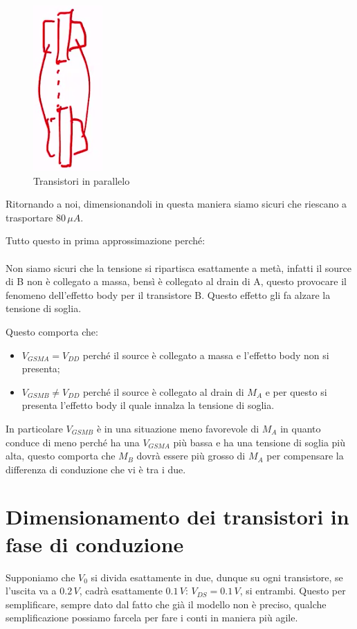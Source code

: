\begin{figure}[htbp]
    \centering
    \includegraphics[width=0.13\linewidth]{img/trans_parall.png}
    \caption{Transistori in parallelo}    
\end{figure}

\newpage
Ritornando a noi, dimensionandoli in questa maniera siamo sicuri che riescano a trasportare $80\,\mu A$. 

Tutto questo in prima approssimazione perché:
\paragraph{}
Non siamo sicuri che la tensione si ripartisca esattamente a metà, infatti il source di B non è collegato a massa, bensì è collegato al drain di A, questo provocare il fenomeno dell'effetto body per il transistore B. Questo effetto gli fa alzare la tensione di soglia.

Questo comporta che:
\begin{itemize}
    \item $V_{GSMA} = V_{DD}$ perché il source è collegato a massa e l'effetto body non si presenta;
    \item $V_{GSMB} \neq V_{DD}$ perché il source è collegato al drain di $M_A$ e per questo si presenta l'effetto body il quale innalza la tensione di soglia. 
\end{itemize}

In particolare $V_{GSMB}$ è in una situazione meno favorevole di $M_A$ in quanto conduce di meno perché ha una $V_{GSMA}$ più bassa e ha una tensione di soglia più alta, questo comporta che $M_B$ dovrà essere più grosso di $M_A$ per compensare la differenza di conduzione che vi è tra i due.

\newpage
\section{Dimensionamento dei transistori in fase di conduzione}

Supponiamo che $V_0$ si divida esattamente in due, dunque su ogni transistore, se l'uscita va a $0.2\,V$, cadrà esattamente $0.1\,V$: $V_{DS} = 0.1\,V$, si entrambi. Questo per semplificare, sempre dato dal fatto che già il modello non è preciso, qualche semplificazione possiamo farcela per fare i conti in maniera più agile.

